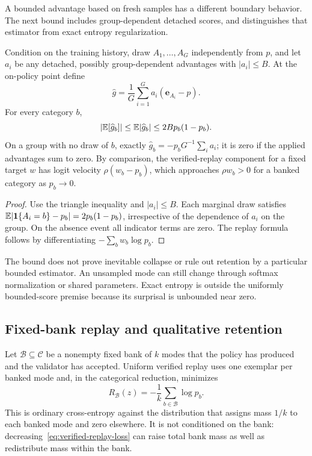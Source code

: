 A bounded advantage based on fresh samples has a different boundary behavior.
The next bound includes group-dependent detached scores, and distinguishes
that estimator from exact entropy regularization.

\begin{lemma}
\label{lem:sampled-score-bound}
Condition on the training history, draw $A_1,\ldots,A_G$ independently from
$p$, and let $a_i$ be any detached, possibly group-dependent advantages with
$|a_i|\le B$. At the on-policy point define
\[
 \widehat g=\frac1G\sum_{i=1}^G a_i(\mathbf e_{A_i}-p).
\]
For every category $b$,
\[
 |\mathbb E[\widehat g_b]|\le\mathbb E|\widehat g_b|
 \le 2B p_b(1-p_b).
\]
On a group with no draw of $b$, exactly
$\widehat g_b=-p_bG^{-1}\sum_i a_i$; it is zero if the applied advantages
sum to zero. By comparison, the verified-replay component for a fixed target
$w$ has logit velocity $\rho(w_b-p_b)$, which approaches $\rho w_b>0$
for a banked category as $p_b\to0$.
\end{lemma}

\begin{proof}
Use the triangle inequality and $|a_i|\le B$. Each marginal draw satisfies
$\mathbb E|\mathbf 1\{A_i=b\}-p_b|=2p_b(1-p_b)$, irrespective of the dependence of
$a_i$ on the group. On the absence event all indicator terms are zero.
The replay formula follows by differentiating $-\sum_b w_b\log p_b$.
\end{proof}

The bound does not prove inevitable collapse or rule out retention by a
particular bounded estimator. An unsampled mode can still change through
softmax normalization or shared parameters. Exact entropy is outside the
uniformly bounded-score premise because its surprisal is unbounded near zero.

\subsection{Fixed-bank replay and qualitative retention}
\label{app:theory-replay}

Let $\mathcal B\subseteq\mathcal C$ be a nonempty fixed bank of $k$ modes that
the policy has produced and the validator has accepted. Uniform verified replay
uses one exemplar per banked mode and, in the categorical reduction, minimizes
\begin{equation}
  R_{\mathcal B}(z)
  =-\frac1k\sum_{b\in\mathcal B}\log p_b.
  \label{eq:verified-replay-loss}
\end{equation}
This is ordinary cross-entropy against the distribution that assigns mass
$1/k$ to each banked mode and zero elsewhere. It is not conditioned on the
bank: decreasing~\eqref{eq:verified-replay-loss} can raise total bank mass as
well as redistribute mass within the bank.

